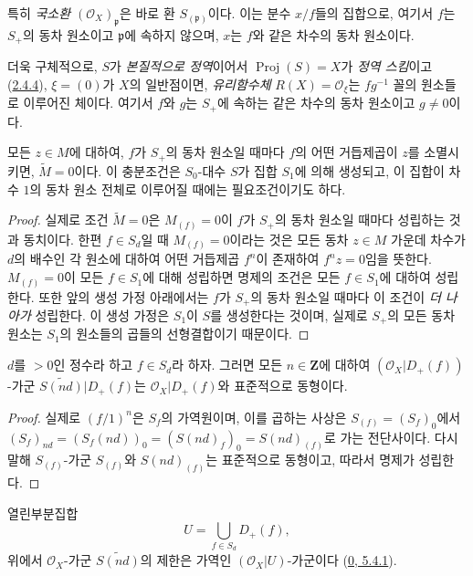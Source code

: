 특히 \emph{국소환 $(\mathcal{O}_X)_\mathfrak{p}$}은 바로 환
$S_{(\mathfrak{p})}$이다. 이는 분수 $x/f$들의 집합으로, 여기서 $f$는
$S_+$의 동차 원소이고 $\mathfrak{p}$에 속하지 않으며, $x$는 $f$와
같은 차수의 동차 원소이다.

더욱 구체적으로, $S$가 \emph{본질적으로 정역}이어서
$\operatorname{Proj}(S)=X$가 \emph{정역 스킴}이고
(\hyperref[II.2.4.4-ko]{2.4.4}), $\xi=(0)$가 $X$의 일반점이면,
\emph{유리함수체} $R(X)=\mathcal{O}_\xi$는 $fg^{-1}$ 꼴의 원소들로 이루어진
체이다. 여기서 $f$와 $g$는 $S_+$에 속하는 같은 차수의 동차 원소이고
$g\neq0$이다.

\begin{proposition}[2.5.6]
\label{II.2.5.6-ko}
모든 $z\in M$에 대하여, $f$가 $S_+$의 동차 원소일 때마다 $f$의 어떤
거듭제곱이 $z$를 소멸시키면, $\widetilde{M}=0$이다. 이 충분조건은
$S_0$-대수 $S$가 집합 $S_1$에 의해 생성되고, 이 집합이 차수 $1$의
동차 원소 전체로 이루어질 때에는 필요조건이기도 하다.
\end{proposition}

\begin{proof}
실제로 조건 $\widetilde{M}=0$은 $M_{(f)}=0$이 $f$가 $S_+$의 동차
원소일 때마다 성립하는 것과 동치이다. 한편 $f\in S_d$일 때
$M_{(f)}=0$이라는 것은 모든 동차 $z\in M$ 가운데 차수가 $d$의 배수인
각 원소에 대하여 어떤 거듭제곱 $f^n$이 존재하여 $f^nz=0$임을 뜻한다.
$M_{(f)}=0$이 모든 $f\in S_1$에 대해 성립하면 명제의 조건은 모든
$f\in S_1$에 대하여 성립한다. 또한 앞의 생성 가정 아래에서는 $f$가
$S_+$의 동차 원소일 때마다 이 조건이 \emph{더 나아가}
성립한다. 이 생성 가정은 $S_1$이 $S$를 생성한다는 것이며, 실제로
$S_+$의 모든 동차 원소는 $S_1$의 원소들의 곱들의 선형결합이기 때문이다.
\end{proof}

\begin{proposition}[2.5.7]
\label{II.2.5.7-ko}
$d$를 $>0$인 정수라 하고 $f\in S_d$라 하자. 그러면 모든
$n\in\mathbf{Z}$에 대하여 $(\mathcal{O}_X|D_+(f))$-가군
$\widetilde{S(nd)}|D_+(f)$는 $\mathcal{O}_X|D_+(f)$와 표준적으로
동형이다.
\end{proposition}

\begin{proof}
실제로 $(f/1)^n$은 $S_f$의 가역원이며, 이를 곱하는 사상은
$S_{(f)}=(S_f)_0$에서
$(S_f)_{nd}=(S_f(nd))_0=(S(nd)_f)_0=S(nd)_{(f)}$로 가는 전단사이다.
다시 말해 $S_{(f)}$-가군 $S_{(f)}$와 $S(nd)_{(f)}$는 표준적으로
동형이고, 따라서 명제가 성립한다.
\end{proof}

\begin{corollary}[2.5.8]
\label{II.2.5.8-ko}
열린부분집합
\[
  U=\bigcup_{f\in S_d}D_+(f),
\]
위에서 $\mathcal{O}_X$-가군 $\widetilde{S(nd)}$의 제한은 가역인
$(\mathcal{O}_X|U)$-가군이다
(\hyperref[0.5.4.1-ko]{0, 5.4.1}).
\end{corollary}

